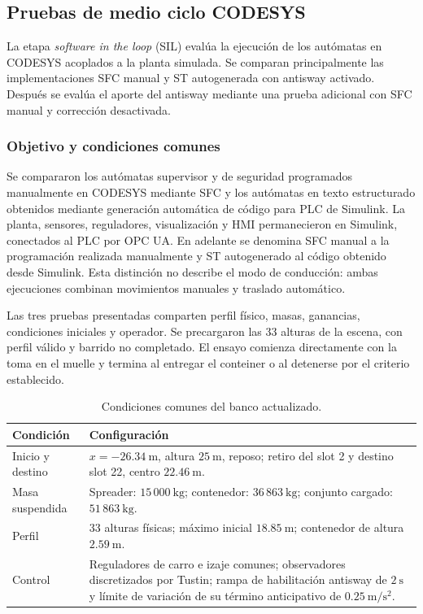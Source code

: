 \subsection{Pruebas de medio ciclo CODESYS}
\label{subsec:medio_ciclo_codesys}
La etapa \textit{software in the loop} (SIL) evalúa la ejecución de los autómatas en CODESYS acoplados a la planta simulada. Se comparan principalmente las implementaciones SFC manual y ST autogenerada con antisway activado. Después se evalúa el aporte del antisway mediante una prueba adicional con SFC manual y corrección desactivada.


\subsubsection{Objetivo y condiciones comunes}
Se compararon los autómatas supervisor y de seguridad programados manualmente en CODESYS mediante SFC y los autómatas en texto estructurado obtenidos mediante generación automática de código para PLC de Simulink. La planta, sensores, reguladores, visualización y HMI permanecieron en Simulink, conectados al PLC por OPC UA. En adelante se denomina SFC manual a la programación realizada manualmente y ST autogenerado al código obtenido desde Simulink. Esta distinción no describe el modo de conducción: ambas ejecuciones combinan movimientos manuales y traslado automático.

Las tres pruebas presentadas comparten perfil físico, masas, ganancias, condiciones iniciales y operador. Se precargaron las 33 alturas de la escena, con perfil válido y barrido no completado. El ensayo comienza directamente con la toma en el muelle y termina al entregar el conteiner o al detenerse por el criterio establecido.

\begin{table}[!htb]\centering\small
\caption{Condiciones comunes del banco actualizado.}\label{tab:condiciones_medio_codesys}
\begin{tabular}{L{.28\textwidth}L{.58\textwidth}}\toprule
Condición & Configuración\\\midrule
Inicio y destino & $x=-26.34~\mathrm{m}$, altura $25~\mathrm{m}$, reposo; retiro del slot 2 y destino slot 22, centro $22.46~\mathrm{m}$.\\
Masa suspendida & Spreader: $15\,000~\mathrm{kg}$; contenedor: $36\,863~\mathrm{kg}$; conjunto cargado: $51\,863~\mathrm{kg}$.\\
Perfil & 33 alturas físicas; máximo inicial $18.85~\mathrm{m}$; contenedor de altura $2.59~\mathrm{m}$.\\
Control & Reguladores de carro e izaje comunes; observadores discretizados por Tustin; rampa de habilitación antisway de $2~\mathrm{s}$ y límite de variación de su término anticipativo de $0.25~\mathrm{m/s^2}$.\\\bottomrule
\end{tabular}\end{table}


